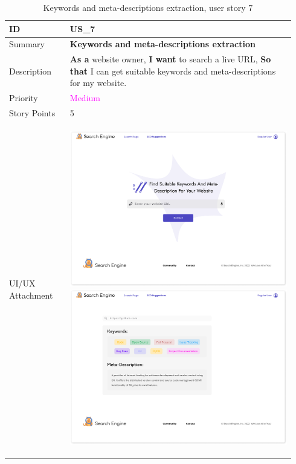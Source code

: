 \documentclass{scrartcl}
\begin{document}
\begin{table}[H]
  \caption{Keywords and meta-descriptions extraction, user story 7}
  \begin{tabular}{p{0.20\linewidth} | p{0.74\linewidth}}
    \toprule
    ID & US\_7
    \\\midrule
    Summary & \textbf{Keywords and meta-descriptions extraction}
    \\\hline
    Description & \textbf{As a} website owner, \textbf{I want} to search a live URL, \textbf{So that} I can get suitable keywords and meta-descriptions for my website.
    \\\hline
    Priority & \textcolor{magenta}{Medium}
    \\\hline
    Story Points & 5
    \\\hline
    UI/UX Attachment & {
                       \begin{center}
                         \includegraphics[scale=0.20]{seo-suggestions.pdf}
                         \includegraphics[scale=0.20]{seo-suggestions-result.pdf}

\end{center}}
\end{tabular}
\end{table}
\end{document}
